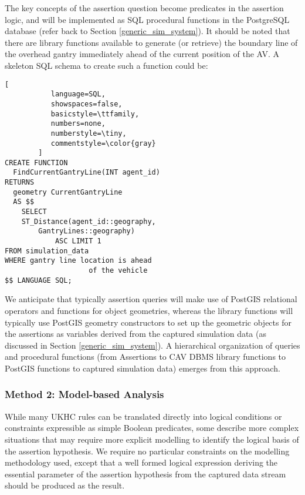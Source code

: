 \begin{itemize}
The key concepts of the assertion question become predicates in the assertion logic, and will be implemented as SQL procedural functions in the PostgreSQL database (refer back to Section \ref{generic_sim_system}). %
It should be noted that there are library functions available to generate (or retrieve) the boundary line of the overhead gantry immediately ahead of the current position of the AV. A skeleton SQL schema to create such a function could be: 

    \begin{lstlisting}[
           language=SQL,
           showspaces=false,
           basicstyle=\ttfamily,
           numbers=none,
           numberstyle=\tiny,
           commentstyle=\color{gray}
        ]
CREATE FUNCTION
  FindCurrentGantryLine(INT agent_id) 
RETURNS 
  geometry CurrentGantryLine
  AS $$
    SELECT 
    ST_Distance(agent_id::geography, 
        GantryLines::geography)
            ASC LIMIT 1
FROM simulation_data
WHERE gantry line location is ahead 
                    of the vehicle
$$ LANGUAGE SQL;
\end{lstlisting}
    We anticipate that typically assertion queries will make use of PostGIS relational operators and functions for object geometries, whereas the library functions will typically use PostGIS geometry constructors to set up the geometric objects for the assertions as variables derived from the captured simulation data (as discussed in Section \ref{generic_sim_system}). A hierarchical organization of queries and procedural functions (from Assertions to CAV DBMS library functions to PostGIS functions to captured simulation data) emerges from this approach.
\end{itemize}


\subsubsection{Method 2: Model-based Analysis} \label{model_based_analysis}

While many UKHC rules can be translated directly into logical conditions or constraints expressible as simple Boolean predicates, some describe more complex situations that may require more explicit modelling to identify the logical basis of the assertion hypothesis. We require no particular constraints on the modelling methodology used, except that a well formed logical expression deriving the essential parameter of the assertion hypothesis from the captured data stream should be produced as the result.

